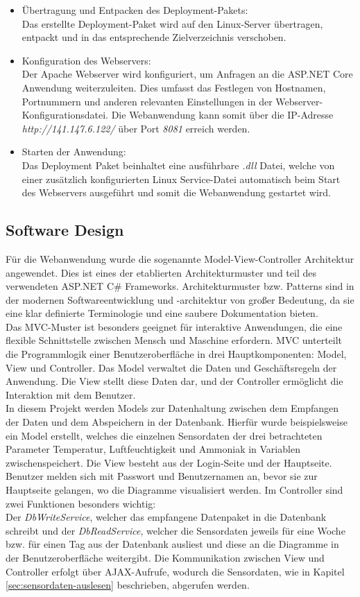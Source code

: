\documentclass[conference]{IEEEtran}
\begin{document}
\begin{itemize}
	\item Übertragung und Entpacken des Deployment-Pakets: \\
	Das erstellte Deployment-Paket wird auf den Linux-Server übertragen, entpackt und in das entsprechende Zielverzeichnis verschoben.
	\item Konfiguration des Webservers: \\
	Der Apache Webserver wird konfiguriert, um Anfragen an die ASP.NET Core Anwendung weiterzuleiten. Dies umfasst das Festlegen von Hostnamen, Portnummern und anderen relevanten Einstellungen in der Webserver-Konfigurationsdatei. Die Webanwendung kann somit über die IP-Adresse \textit{http://141.147.6.122/} über Port \textit{8081} erreich werden.
	\item Starten der Anwendung: \\
	Das Deployment Paket beinhaltet eine ausführbare \textit{.dll} Datei, welche von einer zusätzlich konfigurierten Linux Service-Datei automatisch beim Start des Webservers ausgeführt und somit die Webanwendung gestartet wird.
\end{itemize}
\subsection{Software Design}
Für die Webanwendung wurde die sogenannte Model-View-Controller Architektur angewendet. Dies ist eines der etablierten Architekturmuster und teil des verwendeten ASP.NET C\# Frameworks. Architekturmuster bzw. Patterns sind in der modernen Softwareentwicklung und -architektur von großer Bedeutung, da sie eine klar definierte Terminologie und eine saubere Dokumentation bieten.  \\
Das MVC-Muster ist besonders geeignet für interaktive Anwendungen, die eine flexible Schnittstelle zwischen Mensch und Maschine erfordern. MVC unterteilt die Programmlogik einer Benutzeroberfläche in drei Hauptkomponenten: Model, View und Controller. Das Model verwaltet die Daten und Geschäftsregeln der Anwendung. Die View stellt diese Daten dar, und der Controller ermöglicht die Interaktion mit dem Benutzer. \cite{mvc} \\
In diesem Projekt werden Models zur Datenhaltung zwischen dem Empfangen der Daten und dem Abspeichern in der Datenbank. Hierfür wurde beispielsweise ein Model  erstellt, welches die einzelnen Sensordaten der drei betrachteten Parameter Temperatur, Luftfeuchtigkeit und Ammoniak in Variablen zwischenspeichert. Die View besteht aus der Login-Seite und der Hauptseite. Benutzer melden sich mit Passwort und Benutzernamen an, bevor sie zur Hauptseite gelangen, wo die Diagramme visualisiert werden. Im Controller sind zwei Funktionen besonders wichtig: \\
Der \textit{DbWriteService}, welcher das empfangene Datenpaket in die Datenbank schreibt und der \textit{DbReadService}, welcher die Sensordaten jeweils für eine Woche bzw. für einen Tag aus der Datenbank ausliest und diese an die Diagramme in der Benutzeroberfläche weitergibt. Die Kommunikation zwischen View und Controller erfolgt über AJAX-Aufrufe, wodurch die Sensordaten, wie in Kapitel \ref{sec:sensordaten-auslesen} beschrieben, abgerufen werden.
\newpage
\end{document}
